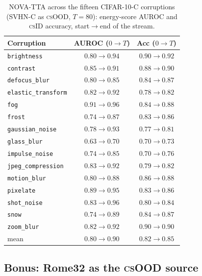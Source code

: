 \documentclass[11pt]{article}
\newcommand{\csid}{\textsc{cs}ID}
\newcommand{\csood}{\textsc{cs}OOD}
\newcommand{\method}[1]{\textsc{#1}}
\begin{document}
\begin{table}[t]
  \centering
  \small
  \caption{\method{NOVA-TTA} across the fifteen CIFAR-10-C corruptions
  (SVHN-C as \csood, $T{=}80$): energy-score AUROC and \csid{} accuracy,
  start$\to$end of the stream.}
  \label{tab:corruptions}
  \begin{tabular}{lcc}
    \toprule
    Corruption & AUROC ($0\to T$) & Acc ($0\to T$)\\
    \midrule
    \texttt{brightness}         & $0.80\to0.94$ & $0.90\to0.92$\\
    \texttt{contrast}           & $0.85\to0.91$ & $0.88\to0.90$\\
    \texttt{defocus\_blur}      & $0.80\to0.85$ & $0.84\to0.87$\\
    \texttt{elastic\_transform} & $0.82\to0.92$ & $0.78\to0.82$\\
    \texttt{fog}                & $0.91\to0.96$ & $0.84\to0.88$\\
    \texttt{frost}              & $0.74\to0.87$ & $0.83\to0.86$\\
    \texttt{gaussian\_noise}    & $0.78\to0.93$ & $0.77\to0.81$\\
    \texttt{glass\_blur}        & $0.63\to0.70$ & $0.70\to0.73$\\
    \texttt{impulse\_noise}     & $0.74\to0.85$ & $0.70\to0.76$\\
    \texttt{jpeg\_compression}  & $0.83\to0.92$ & $0.79\to0.82$\\
    \texttt{motion\_blur}       & $0.80\to0.88$ & $0.86\to0.88$\\
    \texttt{pixelate}           & $0.89\to0.95$ & $0.83\to0.86$\\
    \texttt{shot\_noise}        & $0.83\to0.96$ & $0.80\to0.84$\\
    \texttt{snow}               & $0.74\to0.89$ & $0.84\to0.87$\\
    \texttt{zoom\_blur}         & $0.82\to0.92$ & $0.90\to0.90$\\
    \midrule
    mean                        & $0.80\to0.90$ & $0.82\to0.85$\\
    \bottomrule
  \end{tabular}
\end{table}

\subsection{Bonus: Rome32 as the \csood{} source}\label{sec:nova-rome32}
\end{document}
